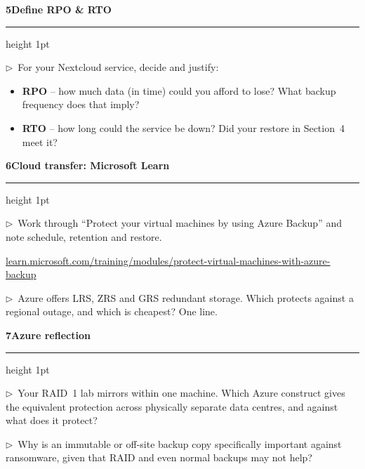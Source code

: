 \documentclass[11pt]{article}
\newcommand{\wbsection}[1]{\par\vspace{11pt}\noindent
  {\large\bfseries\color{kred}#1}\par\vspace{2pt}
  {\color{kred!35}\hrule height 1pt}\par\vspace{6pt}}
\newcommand{\task}[1]{\par\vspace{4pt}\noindent
  \textcolor{kred}{\textbf{$\triangleright$}}~#1\par\vspace{2pt}}
\renewcommand{\emph}[1]{\textup{#1}}
\begin{document}
\wbsection{5\quad Define RPO \& RTO}
\task{For your Nextcloud service, decide and justify:}
\begin{itemize}
\item \textbf{RPO} -- how much data (in time) could you afford to lose? What backup frequency does that
      imply?
\item \textbf{RTO} -- how long could the service be down? Did your restore in Section~4 meet it?
\end{itemize}

\wbsection{6\quad Cloud transfer: Microsoft Learn}
\task{Work through ``Protect your virtual machines by using Azure Backup'' and note schedule, retention
and restore.}
\par\noindent\mbox{\href{https://learn.microsoft.com/training/modules/protect-virtual-machines-with-azure-backup/}{learn.microsoft.com/training/modules/protect-virtual-machines-with-azure-backup}}
\task{Azure offers LRS, ZRS and GRS redundant storage. Which protects against a \emph{regional} outage,
and which is cheapest? One line.}

\wbsection{7\quad Azure reflection}
\task{Your RAID~1 lab mirrors within one machine. Which Azure construct gives the equivalent protection
across \emph{physically separate} data centres, and against what does it protect?}
\task{Why is an \emph{immutable} or off-site backup copy specifically important against ransomware, given
that RAID and even normal backups may not help?}
\end{document}

